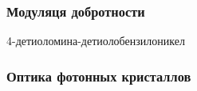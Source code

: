 \subsubsection*{Модуляця добротности}
4-детиоломина-детиолобензилоникел

\subsubsection*{Оптика фотонных кристаллов}

